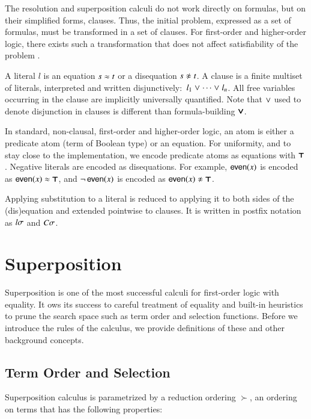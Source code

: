The resolution and superposition calculi do not work directly on formulas, but
on their simplified forms, clauses. Thus, the initial problem, expressed as a
set of formulas, must be transformed in a set of clauses. For first-order and
higher-order logic, there exists such a transformation that does not affect
satisfiability of the problem \cite{nw-01-small-cnf}.

A literal $l$ is an equation $s \approx t$ or a disequation $s \noteq t$. A clause is a
finite multiset of literals, interpreted and written disjunctively:\ $l_1 \mathrel\lor
\cdots \mathrel\lor l_n$. All free variables occurring in the clause are implicitly
universally quantified. Note that $\mathrel\lor$ used to denote disjunction in clauses
is different than formula-building $\pmb\lor$.

In standard, non-clausal, first-order and higher-order logic, an atom  is either
a predicate atom (term of Boolean type) or an equation. For uniformity, and to
stay close to the implementation, we encode predicate atoms as equations with
$\pmb\top$. Negative literals are encoded as disequations. For example,
$\mathsf{even}(x)$ is encoded as $\mathsf{even}(x) \approx \pmb\top$, and
$\neg\,\mathsf{even}(x)$ is encoded as $\neglit{\cst{even}(x)}$. 

Applying substitution to a literal is reduced to applying it to both sides of
the (dis)equation and extended pointwise to clauses. It is written in postfix notation
as $l\sigma$ and $C\sigma$.

\section{Superposition}

Superposition is one of the most successful calculi for first-order logic with
equality. It ows its success to careful treatment of equality and built-in
heuristics to prune the search space such as term order and selection functions.
Before we introduce the rules of the calculus, we provide definitions of these and other
background concepts.

\subsection{Term Order and Selection}

Superposition calculus is parametrized by a reduction ordering $\succ$, an
ordering on terms that has the following properties:

